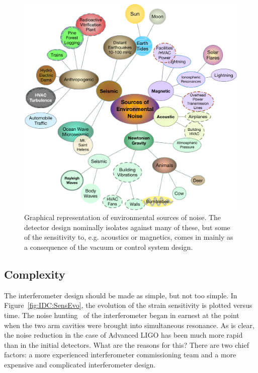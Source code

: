 \begin{figure}[t]
\centering
\includegraphics[width=\columnwidth]{Figures/Environmental.pdf}
\caption{Graphical representation of environmental sources of noise. The detector
design nominally isolates against many of these, but some of the sensitivity to,
e.g. acoustics or magnetics, comes in mainly as a consequence of the vacuum
or control system design.}
\label{fig:EnvironmentalNoise}
\end{figure}

\subsection{Complexity}
\label{s:IDC:Complex}
The interferometer design should be made as simple, but not too simple. In
Figure~\ref{fig:IDC:SensEvo}, the evolution of the strain sensitivity is plotted
versus time. The noise hunting~\cite{Rana:PhD} of the interferometer began in earnest at the
point when the two arm cavities were brought into simultaneous resonance. As is
clear, the noise reduction in the case of Advanced LIGO has been much more rapid
than in the initial detectors. What are the reasons for this? There are two chief
factors: a more experienced interferometer commissioning team and a more expensive
and complicated interferometer design.

